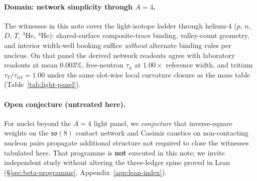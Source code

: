 \documentclass[11pt,notitlepage]{amsart}
\begin{document}
\paragraph{Domain: network simplicity through $A=4$.}
The witnesses in this note cover the light-isotope ladder through helium-4
($p$, $n$, $D$, $T$, ${}^3\mathrm{He}$, ${}^4\mathrm{He}$): shared-surface
composite-trace binding, valley-count geometry, and interior width-well booking
suffice \emph{without} alternate binding rules per nucleus. On that panel the derived
network readouts agree with laboratory readouts at mean $0.003\%$, free-neutron $\tau_n$ at
$1.00\times$ reference width, and tritium $\tau_T/\tau_{\mathrm{ref}}=1.00$ under the
same slot-wise local curvature closure as the mass table (Table~\ref{tab:light-panel}).

\paragraph{Open conjecture (untreated here).}
For nuclei beyond the $A=4$ light panel, we \emph{conjecture} that inverse-square weights
on the $\mathfrak{so}(8)$ contact network and Casimir caustics on non-contacting nucleon
pairs propagate additional structure not required to close the witnesses tabulated here.
That programme is \textbf{not} executed in this note; we invite independent study without
altering the three-ledger spine proved in Lean
(\S\ref{sec:beta-programme}, Appendix~\ref{app:lean-index}).
\end{document}
